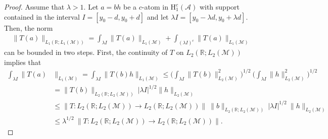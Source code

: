 \documentclass[psamsfonts]{amsart}
\newcommand{\Lone}{L_1}
\newcommand{\Ltwo}{L_2}
\newcommand{\Honec}{\mathrm{H}_1^c}
\newcommand{\Hardyc}{\Honec(\mathcal{A})}
\begin{document}
    \begin{proof}
        Assume that $\lambda >1$. Let $a = bh$ be a $c$-atom in $\Hardyc$ with support contained in the interval $I=[y_0-d,y_0+d]$ and let $\lambda I = [y_0-\lambda d,y_0+\lambda d]$. Then, the norm
        \begin{align*}
            \|T(a)\|_{\Lone(\mathbb{R};\Lone(\mathcal{M}))} = \int_{\lambda I} \|T(a)\|_{\Lone(\mathcal{M})} + \int_{(\lambda I)^c} \|T(a)\|_{\Lone(\mathcal{M})}
        \end{align*}
        can be bounded in two steps. First, the continuity of $T$ on $\Ltwo(\mathbb{R};\Ltwo(\mathcal{M}))$ implies that
        \begin{align*}
            \int_{\lambda I} \|T(a)&\|_{\Lone(\mathcal{M})} = \int_{\lambda I} \|T(b)h\|_{\Lone(\mathcal{M})} \leq \Big( \int_{\lambda I} \|T(b)\|^2_{\Ltwo(\mathcal{M})} \Big)^{1/2} \ \Big( \int_{\lambda I} \|h\|_{\Ltwo(\mathcal{M})}^2 \Big)^{1/2} \\
            &= \|T(b)\|_{\Ltwo(\mathbb{R};\Ltwo(\mathcal{M}))} \ |\lambda I|^{1/2} \|h\|_{\Ltwo(\mathcal{M})} \\
            &\leq \|T : \Ltwo(\mathbb{R};\Ltwo(\mathcal{M})) \rightarrow \Ltwo(\mathbb{R};\Ltwo(\mathcal{M}))\| \ \|b\|_{\Ltwo(\mathbb{R};\Ltwo(\mathcal{M}))} \ |\lambda I|^{1/2} \ \|h\|_{\Ltwo(\mathcal{M})} \\
            &\leq \lambda^{1/2} \ \|T : \Ltwo(\mathbb{R};\Ltwo(\mathcal{M})) \rightarrow \Ltwo(\mathbb{R};\Ltwo(\mathcal{M}))\|.
        \end{align*}


\end{proof}
\end{document}

